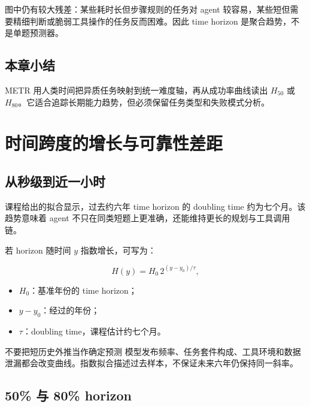 \documentclass[a4paper]{article}
\begin{document}

图中仍有较大残差：某些耗时长但步骤规则的任务对 agent 较容易，某些短但需要精细判断或脆弱工具操作的任务反而困难。因此 time horizon 是聚合趋势，不是单题预测器。

\subsection{本章小结}

METR 用人类时间把异质任务映射到统一难度轴，再从成功率曲线读出 $H_{50}$ 或 $H_{80}$。它适合追踪长期能力趋势，但必须保留任务类型和失败模式分析。

\section{时间跨度的增长与可靠性差距}

\subsection{从秒级到近一小时}


课程给出的拟合显示，过去约六年 time horizon 的 doubling time 约为七个月。该趋势意味着 agent 不只在同类短题上更准确，还能维持更长的规划与工具调用链。

若 horizon 随时间 $y$ 指数增长，可写为：

$$
H(y)=H_0\,2^{(y-y_0)/\tau},
$$

\begin{itemize}
    \item $H_0$：基准年份的 time horizon；
    \item $y-y_0$：经过的年份；
    \item $\tau$：doubling time，课程估计约七个月。
\end{itemize}

\begin{warningbox}{不要把短历史外推当作确定预测}
模型发布频率、任务套件构成、工具环境和数据泄漏都会改变曲线。指数拟合描述过去样本，不保证未来六年仍保持同一斜率。
\end{warningbox}

\subsection{50\% 与 80\% horizon}
\end{document}
